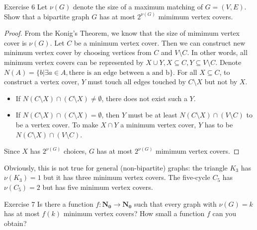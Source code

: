     \begin{thm}{Exercise 6}{}
        Let $\nu(G)$ denote the size of a maximum matching of $G=(V,E)$.
        Show that a bipartite graph $G$ has at most $2^{\nu(G)}$ mimimum vertex covers.
    \end{thm}
    \begin{proof}
        From the Konig's Theorem, we know that the size of mimimum vertex cover is $\nu(G)$.
        Let $C$ be a minimum vertex cover.
        Then we can construct new minimum vertex cover by choosing vertices from $C$ and $V\setminus C$.
        In other words, all minimum vertex covers can be represented by $X\cup Y, X\subseteq C,Y\subseteq V\setminus C$.
        Denote $N(A)=\{b|\exists a\in A, \text{there is an edge between a and b}\}$.
        For all $X\subseteq C$, to construct a vertex cover, $Y$ must touch all edges touched by $C\setminus X$ but not by $X$.
        \begin{itemize}
            \item If $N(C\setminus X)\cap (C\setminus X)\ne \emptyset$, there does not exist such a $Y$.
            \item  If $N(C\setminus X)\cap (C\setminus X)= \emptyset$, then $Y$ must be at least $N(C\setminus X) \cap (V\setminus C)$ to be a vertex cover.
            To make $X\cap Y$ a minimum vertex cover, $Y$ has to be $N(C\setminus X) \cap (V\setminus C)$.
        \end{itemize}

        Since $X$ has $2^{\nu(G)}$ choices, $G$ has at most $2^{\nu(G)}$ mimimum vertex covers.
    \end{proof}

    Obviously, this is not true for general (non-bipartite) graphs: the triangle $K_3$ has $\nu(K_3) = 1$ but it has three minimum vertex covers. The five-cycle $C_5$ has $\nu(C_5) = 2$ but has five minimum vertex covers.

    \begin{thm}{Exercise 7}{}
        Is there a function $f \colon \mathbf{N_0} \rightarrow \mathbf{N_0}$ such that every graph with $\nu(G) = k$ has at most $f(k)$ minimum vertex covers? How small a function $f$ can you obtain?
    \end{thm}

